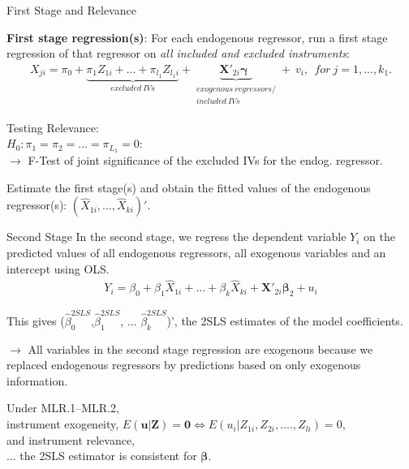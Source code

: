 \documentclass[11pt, aspectratio = 169]{beamer}
\begin{document}
\begin{frame}{First Stage and Relevance}

\textbf{First stage regression(s)}:  For each endogenous regressor, run a first stage regression of that regressor on \alert{\emph{all included and excluded instruments}}:
\begin{align*}
X_{ji} = \pi_0 + \underbrace{\pi_1Z_{1i} + ... + \pi_{l_1} Z_{l_1 i}}_{excluded \: IVs} + \underbrace{\boldsymbol{X}'_{2i}\boldsymbol{\gamma} \: \:}_{\substack{exogenous \: regressors/ \\ included \: IVs}} + \:  v_i,\: \: for \: j = 1,..., k_1.
\end{align*}

Testing Relevance: \\
$H_0: \pi_1 = \pi_2 = ... = \pi_{L_1} = 0$: \\
$\rightarrow$ F-Test of joint significance of the excluded IVs for the endog. regressor. 

\bigskip

Estimate the first stage(s) and obtain the fitted values of the endogenous regressor(s): $(\hat{X}_{1i}, ..., \hat{X}_{ki})'$.

\end{frame}

\begin{frame}{Second Stage}
In the second stage, we regress the dependent variable $Y_i$ on the predicted values of all endogenous regressors, all exogenous variables and an intercept using OLS. 
\begin{align*}
Y_{i} = \beta_0 + \beta_1\hat{X}_{1i} + ... + \beta_{k} \hat{X}_{k i} + \boldsymbol{X}'_{2i}\boldsymbol{\beta}_{2} + u_i
\end{align*}


 
This gives ($\hat{\beta}^{2SLS}_{0}$,$\hat{\beta}^{2SLS}_{1}$, ... $\hat{\beta}^{2SLS}_{k}$)', the 2SLS estimates of the model coefficients.

$\rightarrow$ All variables in the second stage regression are exogenous because we replaced endogenous regressors by predictions based on only exogenous information.
\pause 

Under MLR.1–MLR.2, \\
instrument exogeneity, $E(\boldsymbol{u}|\boldsymbol{Z}) = \boldsymbol{0} \Leftrightarrow E(u_i|Z_{1i}, Z_{2i}, ...., Z_{li}) = 0$, \\
and instrument relevance, \\
... the 2SLS estimator is consistent for $\boldsymbol{\beta}$.  


\end{frame}
\end{document}
